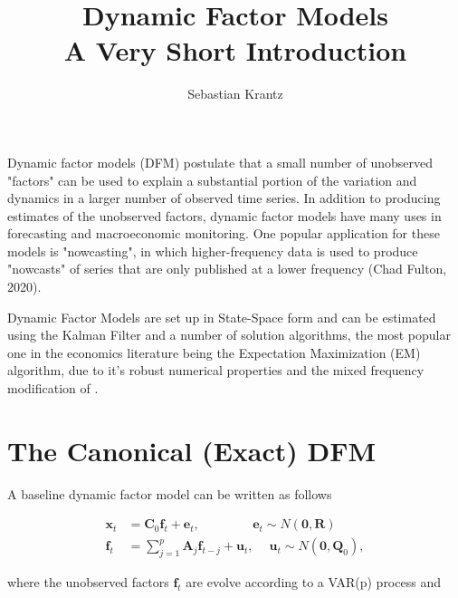 \documentclass[a4paper]{article}
\title{\textbf{Dynamic Factor Models}\\ A Very Short Introduction}
\author{Sebastian Krantz}
\begin{document}
\maketitle

Dynamic factor models (DFM) postulate that a small number of unobserved "factors" can be used to explain a substantial portion of the variation and dynamics in a larger number of observed time series. In addition to producing estimates of the unobserved factors, dynamic factor models have many uses in forecasting and macroeconomic monitoring. One popular application for these models is "nowcasting", in which higher-frequency data is used to produce "nowcasts" of series that are only published at a lower frequency (Chad Fulton, 2020). \newline

Dynamic Factor Models are set up in State-Space form and can be estimated using the Kalman Filter and a number of solution algorithms, the most popular one in the economics literature being the Expectation Maximization (EM) algorithm, due to it's robust numerical properties and the mixed frequency modification of \citet{banbura2014maximum}. \newline

\section{The Canonical (Exact) DFM}

A baseline dynamic factor model can be written as follows

\begin{align} \label{eq:do}
\textbf{x}_t &= \textbf{C}_0 \textbf{f}_t + \textbf{e}_t, \qquad\qquad\, \textbf{e}_t\sim N(\textbf{0}, \textbf{R}) \\ \label{eq:dt}
\textbf{f}_t &= \sum_{j=1}^p \textbf{A}_j \textbf{f}_{t-j} + \textbf{u}_t, \quad\ \textbf{u}_t\sim  N(\textbf{0}, \textbf{Q}_0),
\end{align}

where the unobserved factors $\textbf{f}_t$ are evolve according to a VAR(p) process and  \newline
\end{document}
